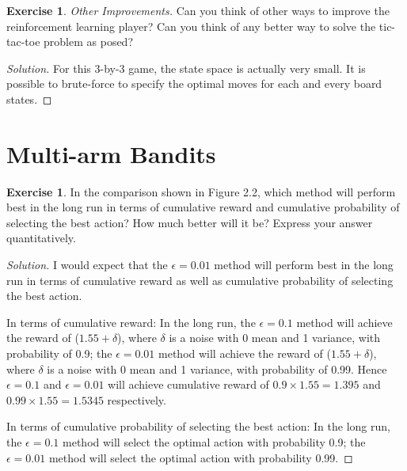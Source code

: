 \documentclass[oneside,11pt]{article}
\theoremstyle{definition}
\newtheorem{exer}[thm]{Exercise}
\newenvironment{solution}
{\renewcommand\qedsymbol{$\blacksquare$}\begin{proof}[Solution]} {\end{proof}}
\begin{document}
\begin{exer}
\emph{Other Improvements.} Can you think of other ways to improve the reinforcement learning player? Can you think of any better way to solve the tic-tac-toe problem as posed?
\end{exer}



\begin{shaded}
\begin{solution} 
For this 3-by-3 game, the state space is actually very small. It is possible to brute-force to specify the optimal moves for each and every board states.
\end{solution}
\end{shaded}



\section{Multi-arm Bandits}

\begin{exer}
In the comparison shown in Figure 2.2, which method will perform best in the long run in terms of cumulative reward and cumulative probability of selecting the best action? How much better will it be? Express your answer quantitatively.
\end{exer}

\begin{shaded}
\begin{solution} 
I would expect that the $\epsilon = 0.01$ method will perform best in the long run in terms of cumulative reward as well as cumulative probability of selecting the best action. 

In terms of cumulative reward: In the long run, the $\epsilon = 0.1$ method will achieve the reward of ($1.55 + \delta$), where $\delta$ is a noise with 0 mean and 1 variance, with probability of 0.9; the $\epsilon = 0.01$ method will achieve the reward of ($1.55 + \delta$), where $\delta$ is a noise with 0 mean and 1 variance, with probability of 0.99.  Hence $\epsilon = 0.1$ and $\epsilon = 0.01$ will achieve cumulative reward of $0.9 \times 1.55 = 1.395$ and $0.99 \times 1.55 = 1.5345$ respectively. 

In terms of cumulative probability of selecting the best action: In the long run, the $\epsilon = 0.1$ method will select the optimal action with probability 0.9; the $\epsilon = 0.01$ method will select the optimal action with probability 0.99. 


\end{solution}
\end{shaded}
\end{document}
